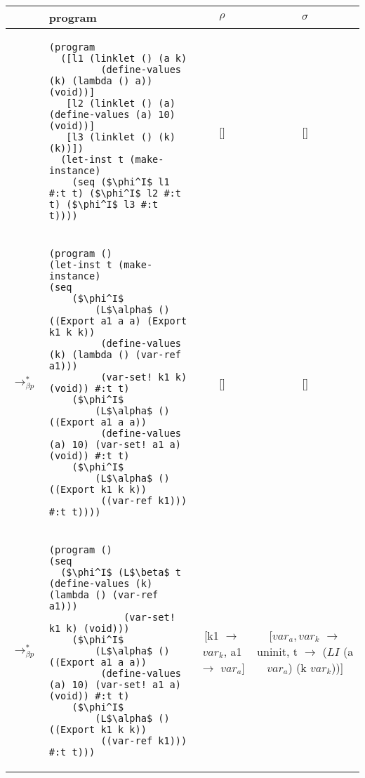 \begin{table}[!htbp]
  \footnotesize
  \begin{tabular}{l >{\centering\arraybackslash}m{} c c}  %
	&\textbf{program} & \textbf{$\rho$} & \textbf{$\sigma$} \\ \hline \hline
	&\begin{lstlisting}[style=numberless]
(program
  ([l1 (linklet () (a k)
         (define-values (k) (lambda () a)) (void))]
   [l2 (linklet () (a) (define-values (a) 10) (void))]
   [l3 (linklet () (k) (k))])
  (let-inst t (make-instance)
    (seq ($\phi^I$ l1 #:t t) ($\phi^I$ l2 #:t t) ($\phi^I$ l3 #:t t))))\end{lstlisting} & [] & [] \\ \hline
	$\longrightarrow_{\beta p}^*$&\begin{lstlisting}[style=numberless]
(program ()
(let-inst t (make-instance)
(seq
	($\phi^I$
		(L$\alpha$ () ((Export a1 a a) (Export k1 k k))
		 (define-values (k) (lambda () (var-ref a1)))
		 (var-set! k1 k) (void)) #:t t)
	($\phi^I$
		(L$\alpha$ () ((Export a1 a a))
		 (define-values (a) 10) (var-set! a1 a) (void)) #:t t)
	($\phi^I$
		(L$\alpha$ () ((Export k1 k k))
		 ((var-ref k1))) #:t t))))\end{lstlisting} & [] & [] \\ \hline
	$\longrightarrow_{\beta p}^*$&\begin{lstlisting}[style=numberless]
(program ()
(seq
  ($\phi^I$ (L$\beta$ t (define-values (k) (lambda () (var-ref a1)))
             (var-set! k1 k) (void)))
	($\phi^I$
		(L$\alpha$ () ((Export a1 a a))
		 (define-values (a) 10) (var-set! a1 a) (void)) #:t t)
	($\phi^I$
		(L$\alpha$ () ((Export k1 k k))
		 ((var-ref k1))) #:t t)))\end{lstlisting} & \thead{[k1 $\rightarrow$ $var_k$, \\a1 $\rightarrow$ $var_a$]} & \thead{[$var_a,var_k$ $\rightarrow$ uninit,\\ t $\rightarrow$ ($LI$ \\ (a $var_a$) (k $var_k$))]} \\ \hline
  \end{tabular}
\end{table}

\clearpage

